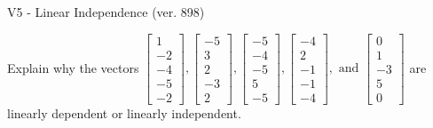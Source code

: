 \begin{exercise}
  \begin{exerciseTitle}V5 - Linear Independence (ver. 898)\end{exerciseTitle}
  \begin{exerciseStatement}
    Explain why the vectors \(\left[\begin{array}{r}
1 \\
-2 \\
-4 \\
-5 \\
-2
\end{array}\right] , \left[\begin{array}{r}
-5 \\
3 \\
2 \\
-3 \\
2
\end{array}\right] , \left[\begin{array}{r}
-5 \\
-4 \\
-5 \\
5 \\
-5
\end{array}\right] , \left[\begin{array}{r}
-4 \\
2 \\
-1 \\
-1 \\
-4
\end{array}\right] , \text{ and } \left[\begin{array}{r}
0 \\
1 \\
-3 \\
5 \\
0
\end{array}\right]\) are linearly dependent or linearly independent.	



\end{exerciseStatement}
\end{exercise}
